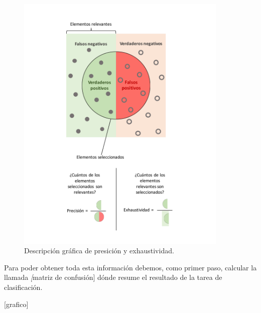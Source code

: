 \begin{figure}[H]
  \centering
    \includegraphics[width=0.9\textwidth]{Figuras/Precision}
      \caption{Descripción gráfica de presición y exhaustividad.}
    \label{fig:precision}
\end{figure}



Para poder obtener toda esta información debemos, como primer paso, calcular la llamada \textit[matriz de confusión] dónde resume el resultado de la tarea de clasificación.

[grafico] 

